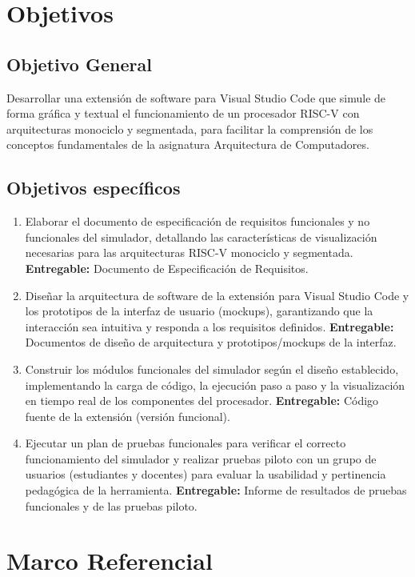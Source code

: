 \documentclass[12pt, letterpaper]{article}
\begin{document}
\section{Objetivos}

\subsection{Objetivo General}
Desarrollar una extensión de software para Visual Studio Code que simule de forma gráfica y textual el funcionamiento de un procesador RISC-V con arquitecturas monociclo y segmentada, para facilitar la comprensión de los conceptos fundamentales de la asignatura Arquitectura de Computadores.

\subsection{Objetivos específicos}
\begin{enumerate}
    \item Elaborar el documento de especificación de requisitos funcionales y no funcionales del simulador, detallando las características de visualización necesarias para las arquitecturas RISC-V monociclo y segmentada. \textbf{Entregable:} Documento de Especificación de Requisitos.
    \item Diseñar la arquitectura de software de la extensión para Visual Studio Code y los prototipos de la interfaz de usuario (mockups), garantizando que la interacción sea intuitiva y responda a los requisitos definidos. \textbf{Entregable:} Documentos de diseño de arquitectura y prototipos/mockups de la interfaz.
    \item Construir los módulos funcionales del simulador según el diseño establecido, implementando la carga de código, la ejecución paso a paso y la visualización en tiempo real de los componentes del procesador. \textbf{Entregable:} Código fuente de la extensión (versión funcional).
    \item Ejecutar un plan de pruebas funcionales para verificar el correcto funcionamiento del simulador y realizar pruebas piloto con un grupo de usuarios (estudiantes y docentes) para evaluar la usabilidad y pertinencia pedagógica de la herramienta. \textbf{Entregable:} Informe de resultados de pruebas funcionales y de las pruebas piloto.
\end{enumerate}


\section{Marco Referencial}
\end{document}
